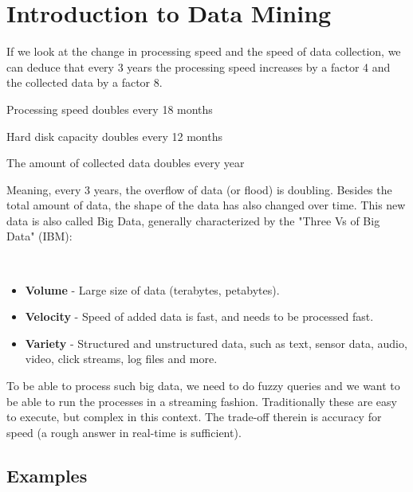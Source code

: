 \section{Introduction to Data Mining}

If we look at the change in processing speed and the
speed of data collection, we can deduce that every 3
years the processing speed increases by a factor 4 and
the collected data by a factor 8.

\begin{definition}
  Processing speed doubles every 18 months
\end{definition}

\begin{definition}
  Hard disk capacity doubles every 12 months
\end{definition}

\begin{definition}
  The amount of collected data doubles every year
\end{definition}

Meaning, every 3 years, the overflow of data (or flood)
is doubling. Besides the total amount of data, the shape
of the data has also changed over time.
This new data is also called Big Data, generally characterized
by the "Three Vs of Big Data" (IBM):

\begin{definition}
  ~
  \begin{itemize}
    \item \textbf{Volume} - Large size of data (terabytes, petabytes).
    \item \textbf{Velocity} - Speed of added data is fast, and needs
      to be processed fast.
    \item \textbf{Variety} - Structured and unstructured data, such
      as text, sensor data, audio, video, click streams, log files and more.
  \end{itemize}
\end{definition}

To be able to process such big data, we need to do fuzzy queries and
we want to be able to run the processes in a streaming fashion. Traditionally
these are easy to execute, but complex in this context.
The trade-off therein is accuracy for speed (a rough answer in
real-time is sufficient).

\subsection{Examples}

